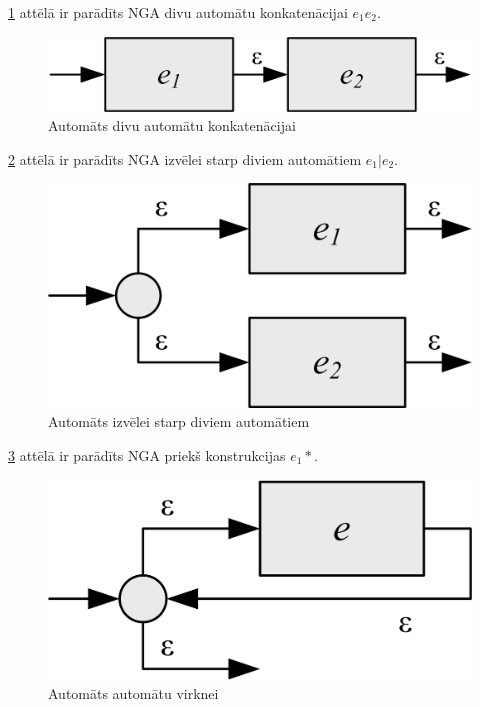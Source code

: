 \ref{fig:auto_sequence} attēlā ir parādīts NGA divu automātu konkatenācijai $e_1 e_2$.
\begin{figure}[H]
  \centering
    \includegraphics[scale=1.5]{pictures/auto_sequence}
  \caption{\label{fig:auto_sequence}Automāts divu automātu konkatenācijai}
\end{figure}

\ref{fig:auto_or} attēlā ir parādīts NGA izvēlei starp diviem automātiem $e_1 | e_2$.
\begin{figure}[H]
  \centering
    \includegraphics[scale=1.5]{pictures/auto_or}
  \caption{\label{fig:auto_or}Automāts izvēlei starp diviem automātiem}
\end{figure}

\ref{fig:auto_asterisk} attēlā ir parādīts NGA priekš konstrukcijas $e_1 *$.
\begin{figure}[H]
  \centering
    \includegraphics[scale=1.5]{pictures/auto_asterisk}
  \caption{\label{fig:auto_asterisk}Automāts automātu virknei}
\end{figure}

